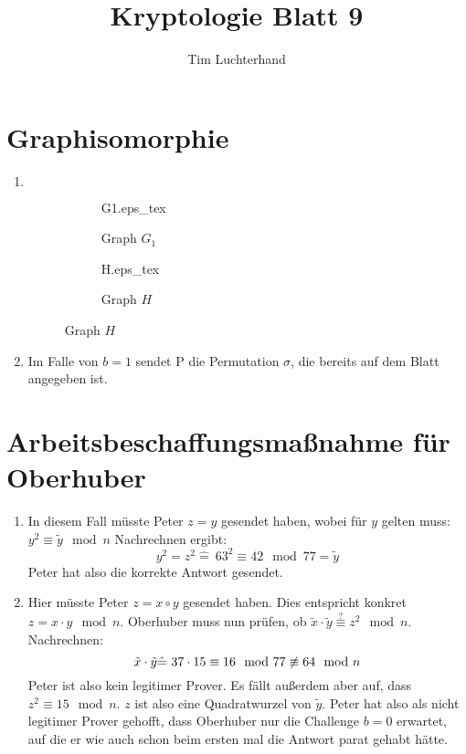 \documentclass[DIN, pagenumber=false, fontsize=11pt, parskip=half]{scrartcl}
\title{Kryptologie Blatt 9}
\author{Tim Luchterhand}
\newcommand{\congTo}[3][]{\stackrel{#1}{\equiv} #2\mod #3}
\newcommand{\incfig}[2][\columnwidth]{%
    \def\svgwidth{#1}
    {#2.eps_tex}
}
\begin{document}
    \maketitle
    \section{Graphisomorphie}
    \begin{enumerate}[label=\alph*)]
        \item $ $
              \begin{figure}[H]
                \centering
                  \begin{subfigure}[l]{0.49\textwidth}
                    \centering
                      \incfig[\textwidth]{G1}
                      \caption{Graph $G_1$}
                  \end{subfigure}  
                  \begin{subfigure}[l]{0.49\textwidth}
                    \centering
                      \incfig[\textwidth]{H}
                      \caption{Graph $H$}
                  \end{subfigure}  
              \end{figure}
        \item Im Falle von $b = 1$ sendet P die Permutation $\sigma$, die bereits auf dem Blatt angegeben ist.
    \end{enumerate}

    \section{Arbeitsbeschaffungsmaßnahme für Oberhuber}
    \begin{enumerate}[label=\alph*)]
        \item In diesem Fall müsste Peter $z = y$ gesendet haben, wobei für $y$ gelten muss: $y^2 \congTo{\tilde{y}}{n}$ Nachrechnen ergibt:
              \begin{equation*}
                  y^2 = z^2 \hat{=} \ 63^2 \congTo{42}{77} = \tilde{y}
              \end{equation*}
              Peter hat also die korrekte Antwort gesendet.
        \item Hier müsste Peter $z = x \circ y$ gesendet haben. Dies entspricht konkret $z = x \cdot y \mod n$. Oberhuber muss nun prüfen, ob
              $\tilde{x} \cdot \tilde{y} \congTo[?]{z^2}{n}$. Nachrechnen:
              \begin{equation*}
                  \tilde{x} \cdot \tilde{y} \hat{=} \ 37 \cdot 15 \congTo{16}{77} \not\congTo{64}{n}
              \end{equation*}
              Peter ist also kein legitimer Prover. Es fällt außerdem aber auf, dass $z^2 \congTo{15}{n}$. $z$ ist also eine Quadratwurzel von
              $\tilde{y}$. Peter hat also als nicht legitimer Prover gehofft, dass Oberhuber nur die Challenge $b = 0$ erwartet, auf die er
              wie auch schon beim ersten mal die Antwort parat gehabt hätte.
    \end{enumerate}
\end{document}
